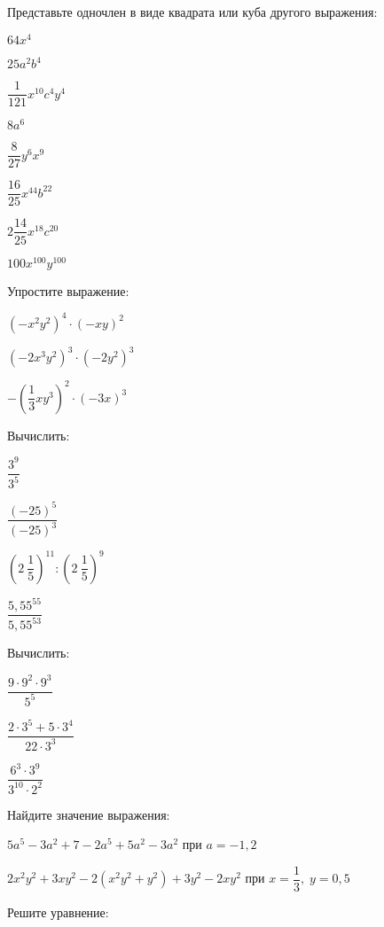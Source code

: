 \begin{listofex}
	\item Представьте одночлен в виде квадрата или куба другого выражения:
	\begin{enumcols}[itemcolumns=4]
		\item \( 64x^4 \)
		\item \( 25a^2b^4 \)
		\item \( \dfrac{1}{121}x^{10}c^4y^{4} \)
		\item \( 8a^6 \)
		\item \( \dfrac{8}{27}y^{6}x^9 \)
		\item \( \dfrac{16}{25}x^{44}b^{22} \)
		\item \( 2\dfrac{14}{25}x^{18}c^{20} \)
		\item \( 100x^{100}y^{100} \)
	\end{enumcols}
	\item Упростите выражение:
	\begin{enumcols}[itemcolumns=3]
		\item \( (-x^2y^2)^4\cdot(-xy)^2 \)
		\item \( (-2x^3y^2)^3\cdot(-2y^2)^3 \)
		\item \( -\left( \dfrac{1}{3}xy^3 \right)^2\cdot(-3x)^3 \)
	\end{enumcols}
	\item Вычислить:
	\begin{enumcols}[itemcolumns=4]
		\item \( \dfrac{3^9}{3^5} \)
		\item \( \dfrac{(-25)^5}{(-25)^3} \)
		\item \( \left( 2\:\dfrac{1}{5} \right)^{11}:\left( 2\:\dfrac{1}{5} \right)^9 \)
		\item \( \dfrac{5,55^{55}}{5,55^{53}} \)
	\end{enumcols}
	\item Вычислить:
	\begin{enumcols}[itemcolumns=3]
		\item \( \dfrac{9\cdot9^2\cdot9^3}{5^{5}} \)
		\item \( \dfrac{2\cdot3^5+5\cdot3^4}{22\cdot3^3} \)
		\item \( \dfrac{6^3\cdot3^9}{3^{10}\cdot2^2} \)
	\end{enumcols}
	\item Найдите значение выражения:
	\begin{enumcols}[itemcolumns=1]
		\item \( 5a^5-3a^2+7-2a^5+5a^2-3a^2 \) при \( a=-1,2 \)
		\item \( 2x^2y^2 + 3xy^2 -2(x^2y^2+y^2) + 3y^2 - 2xy^2\) при \( x=\dfrac{1}{3},\;y=0,5 \)
	\end{enumcols}
	\item Решите уравнение:
	\begin{enumcols}[itemcolumns=3]
		\item {}
		\item {}
		\item {}
		\item {}
		\item {}
	\end{enumcols}
\end{listofex}
